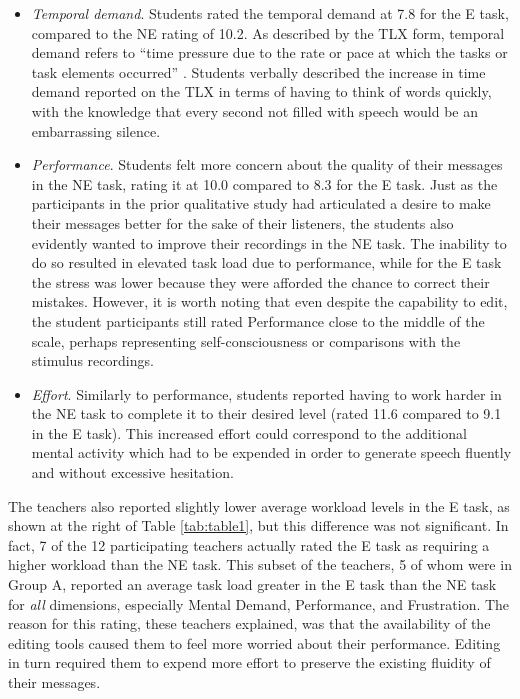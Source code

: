 \begin{itemize}
	\item \emph{Temporal demand}. Students rated the temporal demand at 7.8 for the E task, compared to the NE rating of 10.2. 
	As described by the TLX form, temporal demand refers to ``time pressure due to the rate or pace at which the tasks or task elements occurred'' \cite{nasatlx}.
	Students verbally described the increase in time demand reported on the TLX in terms of having to think of words quickly, with the knowledge that every second not filled with speech would be an embarrassing silence.
	\item \emph{Performance}. Students felt more concern about the quality of their messages in the NE task, rating it at 10.0 compared to 8.3 for the E task. 
	Just as the participants in the prior qualitative study had articulated a desire to make their messages better for the sake of their listeners, the students also evidently wanted to improve their recordings in the NE task. 
	The inability to do so resulted in elevated task load due to performance, while for the E task the stress was lower because they were afforded the chance to correct their mistakes.
	However, it is worth noting that even despite the capability to edit, the student participants still rated Performance close to the middle of the scale, perhaps representing self-consciousness or comparisons with the stimulus recordings.
	\item \emph{Effort}. Similarly to performance, students reported having to work harder in the NE task to complete it to their desired level (rated 11.6 compared to 9.1 in the E task). 
	This increased effort could correspond to the additional mental activity which had to be expended in order to generate speech fluently and without excessive hesitation.
\end{itemize}

The teachers also reported slightly lower average workload levels in the E task, as shown at the right of Table \ref{tab:table1}, but this difference was not significant.
In fact, 7 of the 12 participating teachers actually rated the E task as requiring a higher workload than the NE task.
This subset of the teachers, 5 of whom were in Group A, reported an average task load greater in the E task than the NE task for \emph{all} dimensions, especially Mental Demand, Performance, and Frustration.
The reason for this rating, these teachers explained, was that the availability of the editing tools caused them to feel more worried about their performance.
Editing in turn required them to expend more effort to preserve the existing fluidity of their messages.

